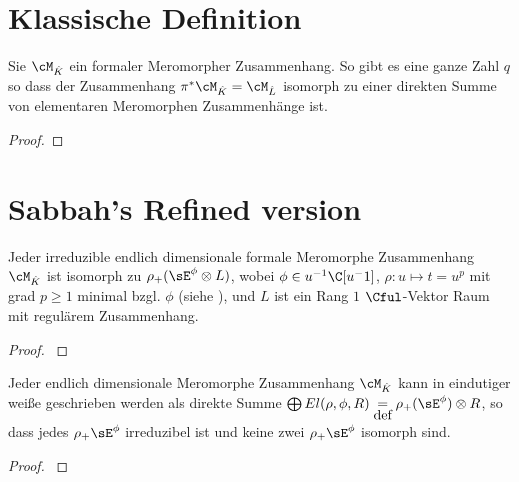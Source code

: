 \section{Klassische Definition}
\begin{thm}
\cite[Thm 5.4.7]{sabbah_cimpa90}
Sie $\cM_{\hat K}$ ein formaler Meromorpher Zusammenhang. So gibt es eine
ganze Zahl $q$ so dass der Zusammenhang $\pi^*\cM_{\hat K}=\cM_{\hat L}$
isomorph zu einer direkten Summe von elementaren Meromorphen Zusammenhänge
ist.
\end{thm}
\begin{proof}

\end{proof}

\section{Sabbah's Refined version}
\begin{prop}
\cite[Prop 3.1]{sabbah_Fourier-local}
Jeder irreduzible endlich dimensionale formale Meromorphe Zusammenhang
$\cM_{\hat K}$ ist isomorph zu $\rho_+(\sE^\phi\otimes L)$, wobei $\phi\in
u^{-1}\C[u^-1]$, $\rho:u\mapsto t=u^p$ mit grad $p\geq1$ minimal bzgl. $\phi$
(siehe \cite[Rem 2.8]{sabbah_Fourier-local}), und $L$ ist ein Rang $1$
$\Cful$-Vektor Raum mit regulärem Zusammenhang.
\end{prop}
\begin{proof}
\cite[Prop 3.1]{sabbah_Fourier-local}
\end{proof}

\begin{thm}
\cite[Cor 3.3]{sabbah_Fourier-local}
Jeder endlich dimensionale Meromorphe Zusammenhang $\cM_{\hat K}$ kann in
eindutiger weiße geschrieben werden als direkte Summe $\bigoplus
El(\rho,\phi,R)\underset{\mbox{def}}{=}\rho_+(\sE^\phi)\otimes R$, so dass
jedes $\rho_+\sE^\phi$ irreduzibel ist und keine zwei $\rho_+\sE^\phi$ isomorph
sind.
\end{thm}
\begin{proof}
\cite[Cor 3.3]{sabbah_Fourier-local}
\end{proof}

